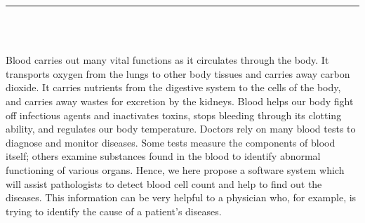 \documentclass[12pt]{report}
\begin{document}


\newpage

\pagestyle{myfancy}

\vspace*{-0.2in}

\setcounter{page}{1}

\begin{center}
    {\color{Black} \rule{6.2in}{1.4mm} }\\
    \vspace{0.1in}
    \scshape{\fontsize{34}{46}{\bfseries{\color{Black}{General Introduction}}}}
    \\
    \vspace{0.5in}
\end{center}
\hspace*{0.16in}

Blood carries out many vital functions as it circulates through the body. It transports oxygen from the lungs to other body tissues and carries away carbon dioxide. It carries nutrients from the digestive system to the cells of the body, and carries away wastes for excretion by the kidneys. Blood helps our body fight off infectious agents and inactivates toxins, stops bleeding through its clotting ability, and regulates our body temperature. Doctors rely on many blood tests to diagnose and monitor diseases. Some tests measure the components of blood itself; others examine substances found in the blood to identify abnormal functioning of various organs. Hence, we here propose a software system which will assist pathologists to detect blood cell count and help to find out the diseases. This information can be very helpful to a physician who, for example, is trying to identify the cause of a patient's diseases.
\end{document}

